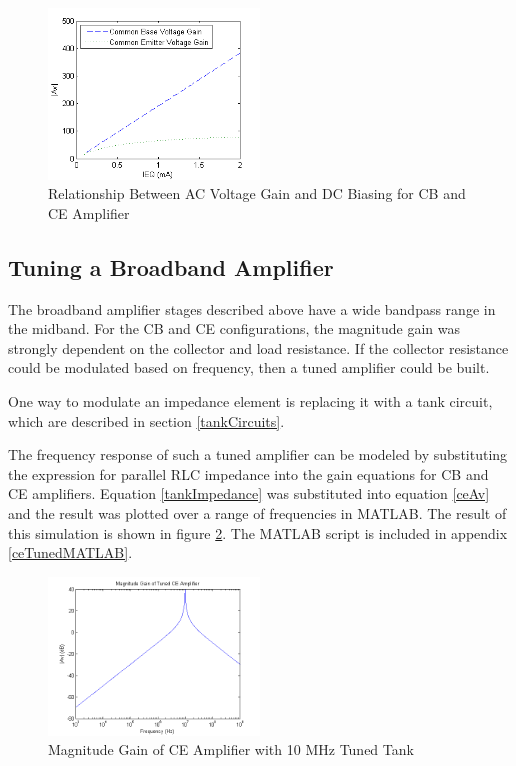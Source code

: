\documentclass[titlepage, letterpaper, 10.5pt]{article}
\begin{document}
\begin{figure}[ht]
	\centering
	\includegraphics[width=0.5\textwidth]
		{MATLAB/AvQptRelationship}
	\caption{
		Relationship Between AC Voltage Gain and DC Biasing
		for CB and CE Amplifier
	}
	\label{gainQptRelation}
\end{figure}

\subsection{Tuning a Broadband Amplifier}

The broadband amplifier stages described above have a wide bandpass
range in the midband. For the CB and CE configurations, the magnitude
gain was strongly dependent on the collector and load resistance. If
the collector resistance could be modulated based on frequency, then
a tuned amplifier could be built.

One way to modulate an impedance element is replacing it with a tank
circuit, which are described in section \ref{tankCircuits}.

The frequency response of such a tuned amplifier can be modeled by
substituting the expression for parallel RLC impedance into the gain
equations for CB and CE amplifiers. Equation \ref{tankImpedance} was
substituted into equation \ref{ceAv} and the result was plotted over
a range of frequencies in MATLAB. The result of this simulation is
shown in figure \ref{ceTunedMag}. The MATLAB script is included
in appendix \ref{ceTunedMATLAB}.

\begin{figure}[ht]
	\centering
	\includegraphics[width=0.5\textwidth]{MATLAB/ceTunedMag}
	\caption{Magnitude Gain of CE Amplifier with 10 MHz Tuned Tank}
	\label{ceTunedMag}
\end{figure}
\end{document}
